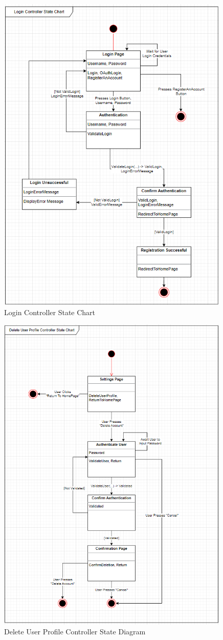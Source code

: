 \documentclass[]{article}
\begin{document}
\begin{figure}[h]
	\centering
	\includegraphics[width=30em]{assets/D3_3.PNG}
	\caption{Login Controller State Chart}
	\label{fig:acd}
\end{figure}
\pagebreak

\begin{figure}[h]
	\centering
	\includegraphics[width=30em]{assets/D3_4.PNG}
	\caption{Delete User Profile Controller State Diagram}
	\label{fig:acd}
\end{figure}
\pagebreak
\end{document}
